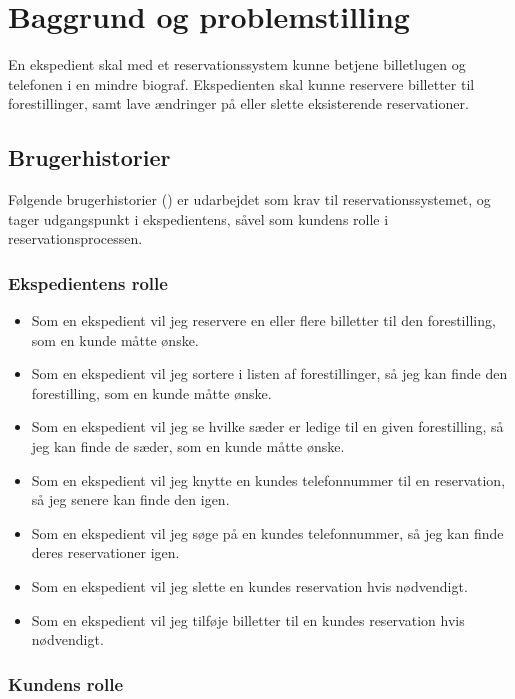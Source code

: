 \chapter{Baggrund og problemstilling}

En ekspedient skal med et reservationssystem kunne betjene billetlugen og telefonen i en mindre biograf. Ekspedienten skal kunne reservere billetter til forestillinger, samt lave ændringer på eller slette eksisterende reservationer.

\section{Brugerhistorier}

Følgende brugerhistorier (\cite{wiki:user-story}) er udarbejdet som krav til reservationssystemet, og tager udgangspunkt i ekspedientens, såvel som kundens rolle i reservationsprocessen.

\subsection{Ekspedientens rolle}

\begin{itemize}
  \item Som en ekspedient vil jeg reservere en eller flere billetter til den forestilling, som en kunde måtte ønske.
  \item Som en ekspedient vil jeg sortere i listen af forestillinger, så jeg kan finde den forestilling, som en kunde måtte ønske.
  \item Som en ekspedient vil jeg se hvilke sæder er ledige til en given forestilling, så jeg kan finde de sæder, som en kunde måtte ønske.
  \item Som en ekspedient vil jeg knytte en kundes telefonnummer til en reservation, så jeg senere kan finde den igen.
  \item Som en ekspedient vil jeg søge på en kundes telefonnummer, så jeg kan finde deres reservationer igen.
  \item Som en ekspedient vil jeg slette en kundes reservation hvis nødvendigt.
  \item Som en ekspedient vil jeg tilføje billetter til en kundes reservation hvis nødvendigt.
\end{itemize}
  
\subsection{Kundens rolle}

